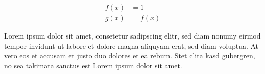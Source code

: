 \documentclass{minimal}
\begin{document}
\begin{align}
  f(x) &= 1 \\
  g(x) &= f(x)
\end{align}

Lorem ipsum dolor sit amet, consetetur sadipscing elitr, sed diam nonumy eirmod
tempor invidunt ut labore et dolore magna aliquyam erat, sed diam voluptua. At
vero eos et accusam et justo duo dolores et ea rebum. Stet clita kasd
gubergren, no sea takimata sanctus est Lorem ipsum dolor sit amet.
\end{document}
